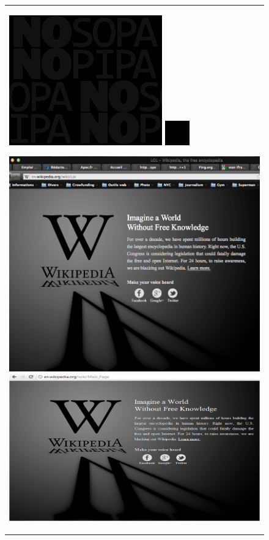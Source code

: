 \begin{figure}
\begin{tabular}{p{\textwidth}}
\begin{thumbsequence}
		\includegraphics[height=\thumbheight]{sopa/looseduplicate7.png}
		\includegraphics[height=\thumbheight]{sopa/looseduplicate8.jpg}
	\end{thumbsequence}
	\newstrip
	\begin{thumbsequence}
		\includegraphics[height=\thumbheight]{sopa/looseduplicate9.png}
		\includegraphics[height=\thumbheight]{sopa/looseduplicate10.png}

\end{thumbsequence}
\end{tabular}
\end{figure}
